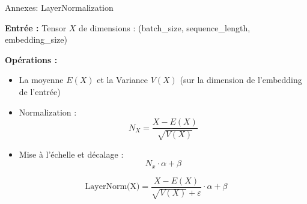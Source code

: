 \documentclass[12pt]{beamer}
\begin{document}

\begin{frame}{Annexes: LayerNormalization}

\footnotesize
\textbf{Entrée : } Tensor $X$ de dimensions : (batch\_size, sequence\_length, embedding\_size)

\textbf{Opérations : }

\begin{itemize}
	\item La moyenne $E(X)$ et la Variance $V(X)$ (sur la dimension de l'embedding de l'entrée)
	\item Normalization : $$N_X = \frac{X - E(X)}{\sqrt{V(X)}}$$
	\item Mise à l'échelle et décalage : $$N_x \cdot \alpha + \beta$$
\end{itemize}

$$\text{LayerNorm(X)} = \frac{X - E(X)}{\sqrt{V(X)}+\varepsilon} \cdot \alpha + \beta$$

\normalsize

\end{frame}




\end{document}
